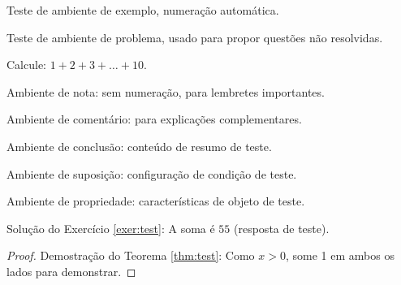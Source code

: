 \documentclass[pt]{../../elegantbook}
\begin{document}
\begin{definition}
\begin{theorem}
\begin{lemma}
\begin{corollary}
\begin{axiom}
\begin{postulate}
\begin{proposition}
\begin{example}\label{exa:test}
Teste de ambiente de exemplo, numeração automática.
\end{example}

\begin{problem}\label{probl:test}
Teste de ambiente de problema, usado para propor questões não resolvidas.
\end{problem}

\begin{exercise}\label{exer:test}
Calcule: $1+2+3+\dots+10$.
\end{exercise}

\begin{note}
Ambiente de nota: sem numeração, para lembretes importantes.
\end{note}

\begin{remark}
Ambiente de comentário: para explicações complementares.
\end{remark}

\begin{conclusion}
Ambiente de conclusão: conteúdo de resumo de teste.
\end{conclusion}

\begin{assumption}
Ambiente de suposição: configuração de condição de teste.
\end{assumption}

\begin{property}
Ambiente de propriedade: características de objeto de teste.
\end{property}

\begin{solution}
Solução do Exercício \ref{exer:test}: A soma é $55$ (resposta de teste).
\end{solution}

\begin{proof}
Demostração do Teorema \ref{thm:test}: Como $x>0$, some 1 em ambos os lados para demonstrar.
\end{proof}


\end{proposition}
\end{postulate}
\end{axiom}
\end{corollary}
\end{lemma}
\end{theorem}
\end{definition}
\end{document}
